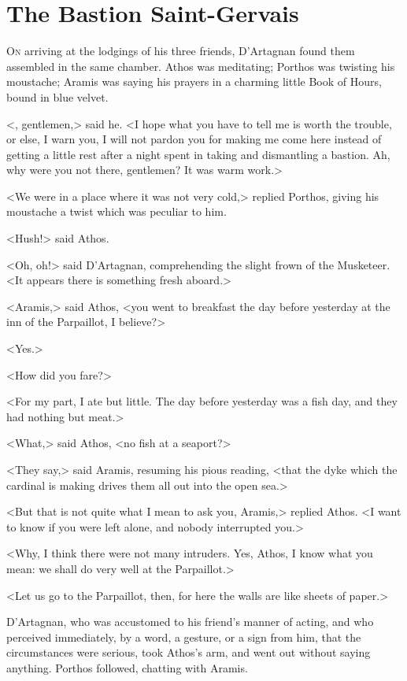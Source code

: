
\chapter{The Bastion Saint-Gervais}

\lettrine{O}{n} arriving at the lodgings of his three friends, D'Artagnan found them assembled in the same chamber. Athos was meditating; Porthos was twisting his moustache; Aramis was saying his prayers in a charming little Book of Hours, bound in blue velvet. 

<, gentlemen,> said he. <I hope what you have to tell me is worth the trouble, or else, I warn you, I will not pardon you for making me come here instead of getting a little rest after a night spent in taking and dismantling a bastion. Ah, why were you not there, gentlemen? It was warm work.> 

<We were in a place where it was not very cold,> replied Porthos, giving his moustache a twist which was peculiar to him. 

<Hush!> said Athos. 

<Oh, oh!> said D'Artagnan, comprehending the slight frown of the Musketeer. <It appears there is something fresh aboard.> 

<Aramis,> said Athos, <you went to breakfast the day before yesterday at the inn of the Parpaillot, I believe?> 

<Yes.> 

<How did you fare?> 

<For my part, I ate but little. The day before yesterday was a fish day, and they had nothing but meat.> 

<What,> said Athos, <no fish at a seaport?> 

<They say,> said Aramis, resuming his pious reading, <that the dyke which the cardinal is making drives them all out into the open sea.> 

<But that is not quite what I mean to ask you, Aramis,> replied Athos. <I want to know if you were left alone, and nobody interrupted you.> 

<Why, I think there were not many intruders. Yes, Athos, I know what you mean: we shall do very well at the Parpaillot.> 

<Let us go to the Parpaillot, then, for here the walls are like sheets of paper.> 

D'Artagnan, who was accustomed to his friend's manner of acting, and who perceived immediately, by a word, a gesture, or a sign from him, that the circumstances were serious, took Athos's arm, and went out without saying anything. Porthos followed, chatting with Aramis. 

